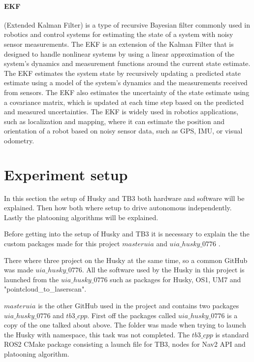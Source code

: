 \paragraph{EKF} (Extended Kalman Filter) is a type of recursive Bayesian filter commonly used in robotics and control systems for estimating the state of a system with noisy sensor measurements. The EKF is an extension of the Kalman Filter that is designed to handle nonlinear systems by using a linear approximation of the system's dynamics and measurement functions around the current state estimate. The EKF estimates the system state by recursively updating a predicted state estimate using a model of the system's dynamics and the measurements received from sensors. The EKF also estimates the uncertainty of the state estimate using a covariance matrix, which is updated at each time step based on the predicted and measured uncertainties. The EKF is widely used in robotics applications, such as localization and mapping, where it can estimate the position and orientation of a robot based on noisy sensor data, such as GPS, IMU, or visual odometry.


\section{Experiment setup}
In this section the setup of Husky and TB3 both hardware and software will be explained. Then how both where setup to drive autonomous independently. Lastly the platooning algorithms will be explained. 

Before getting into the setup of Husky and TB3 it is necessary to explain the the custom packages made for this project $masteruia$ \cite{masteruia} and $uia\_husky\_0776$ \cite{uiahusky}. 

There where three project on the Husky at the same time, so a common GitHub was made $uia\_husky\_0776$. All the software used by the Husky in this project is launched from the $uia\_husky\_0776$ such as packages for Husky, OS1, UM7 and "pointcloud\_to\_laserscan".

$masteruia$ is the other GitHub used in the project and contains two packages $uia\_husky\_0776$ and $tb3\_cpp$.
First off the packages called $uia\_husky\_0776$ is a copy of the one talked about above. The folder was made when trying to launch the Husky with namespace, this task was not completed. 
The $tb3\_cpp$ is standard ROS2 CMake package consisting a launch file for TB3, nodes for Nav2 API and platooning algorithm. 
                      

